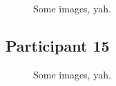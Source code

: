 \lipsum[1]

\clearpage

\begin{figure}[h]
	\caption{Some images, yah.}
\end{figure}

\lipsum[1]


\clearpage

\subsection{Participant 15}

\begin{figure}[h]
	\caption{Some images, yah.}
\end{figure}

\lipsum[1]

